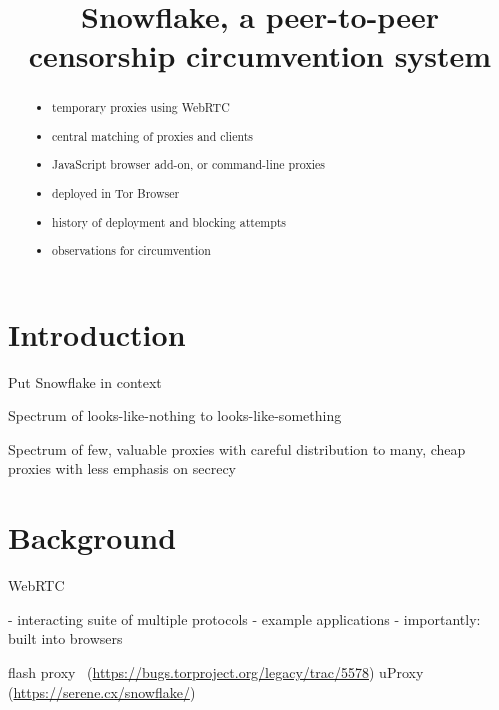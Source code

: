 \documentclass[letterpaper,twocolumn]{article}
\begin{document}
\date{}

\title{Snowflake, a peer-to-peer censorship circumvention system}

\author{}

\maketitle

\begin{abstract}
\begin{itemize}
\item temporary proxies using WebRTC
\item central matching of proxies and clients
\item JavaScript browser add-on, or command-line proxies
\item deployed in Tor Browser
\item history of deployment and blocking attempts
\item observations for circumvention
\end{itemize}
\end{abstract}


\section{Introduction}
\label{sec:intro}

Put Snowflake in context

Spectrum of looks-like-nothing to looks-like-something

Spectrum of few, valuable proxies with careful distribution to
many, cheap proxies with less emphasis on secrecy

\section{Background}
\label{sec:background}


WebRTC

- interacting suite of multiple protocols
- example applications
- importantly: built into browsers

flash proxy~\cite{Fifield2012a} (\url{https://bugs.torproject.org/legacy/trac/5578})
uProxy (\url{https://serene.cx/snowflake/})
\end{document}
